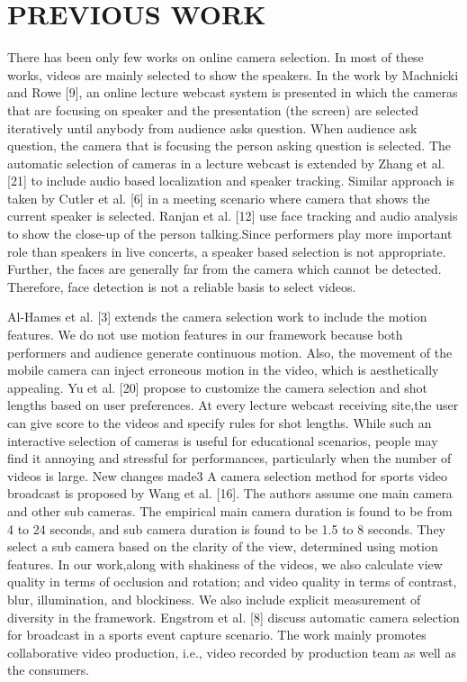 \documentclass{sig-alternate}
\begin{document}
\section{PREVIOUS WORK}
There has been only few works on online camera selection. In most of these works, videos are mainly selected to show the speakers. In the work by Machnicki and Rowe [9], an online lecture webcast system is presented in which the cameras that are focusing on speaker and the presentation (the screen) are selected iteratively until anybody from audience asks question. When audience ask question, the camera that is focusing the person asking question is selected. The automatic selection of cameras in a lecture webcast is extended by Zhang et al. [21] to include audio based localization and speaker tracking. Similar approach is taken by Cutler et al. [6] in a meeting scenario where camera that shows the current speaker is selected. Ranjan et al. [12] use face tracking and audio analysis to show the close-up of the person talking.Since performers play more important role than speakers in live concerts, a speaker based selection is not appropriate. Further, the faces are generally far from the camera which cannot be detected. Therefore, face detection is not a reliable basis to select videos.

Al-Hames et al. [3] extends the camera selection work to include the motion features. We do not use motion features in our framework because both performers and audience generate continuous motion. Also, the movement of the mobile camera can inject erroneous motion in the video, which is aesthetically appealing. Yu et al. [20] propose to customize the camera selection and shot lengths based on user preferences. At every lecture webcast receiving site,the user can give score to the videos and specify rules for shot lengths. While such an interactive selection of cameras is useful for educational scenarios, people may find it annoying and stressful for performances, particularly when the number of videos is large.
New changes made3
A camera selection method for sports video broadcast is proposed by Wang et al. [16]. The authors assume one main camera and other sub cameras. The empirical main camera duration is found to be from 4 to 24 seconds, and sub camera duration is found to be 1.5 to 8 seconds. They select a sub camera based on the clarity of the view, determined using motion features. In our work,along with shakiness of the videos, we also calculate view quality in terms of occlusion and rotation; and video quality in terms of contrast, blur, illumination, and blockiness. We also include explicit measurement of diversity in the framework. Engstrom et al. [8] discuss automatic camera selection for broadcast in a sports event capture scenario. The work mainly promotes collaborative video production, i.e., video recorded by production team as well as the consumers.
\end{document}
